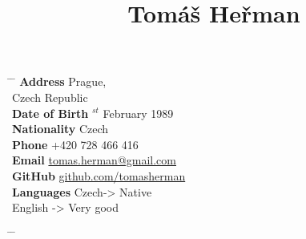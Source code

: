 \documentclass[10pt]{article} %
\begin{document}

\title{Tomáš Heřman} %


\parbox{0.5\textwidth}{ %
    \begin{tabbing} %
        \hspace{3cm} \= \hspace{4cm} \= \kill %
{\bf {} Address} \>Prague,\\ %
\> Czech Republic \\ %
{\bf {} Date of Birth} $^{st}$ February 1989 \\ %
{\bf {} Nationality} \> Czech \\ %
{\bf {} Phone} \> +420 728 466 416 \\ %
{\bf {} Email} \> \href{mailto:tomas.herman@gmail.com}{tomas.herman@gmail.com} \\ %
{\bf {} GitHub} \> \href{https://github.com/tomasherman}{github.com/tomasherman} \\
{\bf {} Languages} \> Czech-> Native\\
        \> English -> Very good

\end{tabbing}}
\hfill %
\parbox{0.5\textwidth}{ %
\begin{tabbing} %
\hspace{3cm} \= \hspace{4cm} \= \kill %
 \\
\end{tabbing}}
\end{document}
